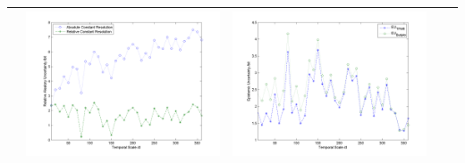 \documentclass[11pt]{article}
\begin{document}
\begin{table}[H]
{\begin{tabular}{c  c   c   c c }
&\begin{minipage}{.4\textwidth}\includegraphics[width=\linewidth]{resultgraph/14359000AU.png}\end{minipage}
&\begin{minipage}{.4\textwidth}\includegraphics[width=\linewidth]{resultgraph/14359000EU.png}\end{minipage}
\\
\bottomrule
\end{tabular}
}
\end{table}
\end{document}
